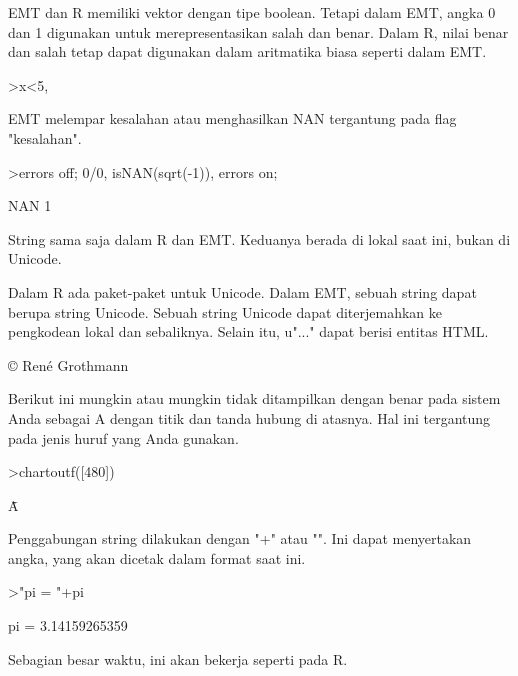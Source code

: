 \documentclass[a4paper,10pt]{article}
\begin{document}
\begin{eulernotebook}
\begin{eulercomment}
\begin{eulercomment}
\begin{eulercomment}
\begin{eulercomment}
\begin{eulercomment}
EMT dan R memiliki vektor dengan tipe boolean. Tetapi dalam EMT, angka
0 dan 1 digunakan untuk merepresentasikan salah dan benar. Dalam R,
nilai benar dan salah tetap dapat digunakan dalam aritmatika biasa
seperti dalam EMT.
\end{eulercomment}
\begin{eulerprompt}
>x<5, %
\end{eulerprompt}
\begin{euleroutput}
  [0,  0,  1,  0,  0]
  [0,  0,  3.1,  0,  0]
\end{euleroutput}
\begin{eulercomment}
EMT melempar kesalahan atau menghasilkan NAN tergantung pada flag
"kesalahan".
\end{eulercomment}
\begin{eulerprompt}
>errors off; 0/0, isNAN(sqrt(-1)), errors on;
\end{eulerprompt}
\begin{euleroutput}
  NAN
  1
\end{euleroutput}
\begin{eulercomment}
String sama saja dalam R dan EMT. Keduanya berada di lokal saat ini,
bukan di Unicode.

Dalam R ada paket-paket untuk Unicode. Dalam EMT, sebuah string dapat
berupa string Unicode. Sebuah string Unicode dapat diterjemahkan ke
pengkodean lokal dan sebaliknya. Selain itu, u"..." dapat berisi
entitas HTML.
\end{eulercomment}
\begin{euleroutput}
  © René Grothmann
\end{euleroutput}
\begin{eulercomment}
Berikut ini mungkin atau mungkin tidak ditampilkan dengan benar pada
sistem Anda sebagai A dengan titik dan tanda hubung di atasnya. Hal
ini tergantung pada jenis huruf yang Anda gunakan.
\end{eulercomment}
\begin{eulerprompt}
>chartoutf([480])
\end{eulerprompt}
\begin{euleroutput}
  Ǡ
\end{euleroutput}
\begin{eulercomment}
Penggabungan string dilakukan dengan "+" atau "\textbar{}". Ini dapat
menyertakan angka, yang akan dicetak dalam format saat ini.
\end{eulercomment}
\begin{eulerprompt}
>"pi = "+pi
\end{eulerprompt}
\begin{euleroutput}
  pi = 3.14159265359
\end{euleroutput}
\begin{eulercomment}
Sebagian besar waktu, ini akan bekerja seperti pada R.


\end{eulercomment}
\end{eulercomment}
\end{eulercomment}
\end{eulercomment}
\end{eulercomment}
\end{eulernotebook}
\end{document}

